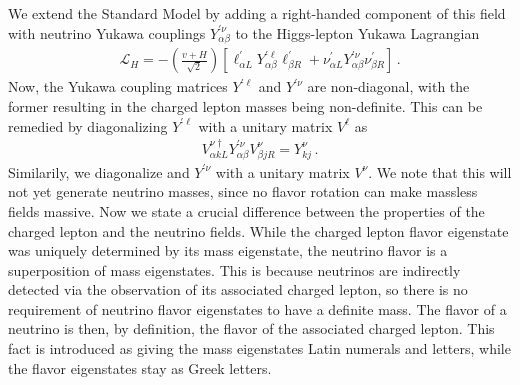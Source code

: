We extend the Standard Model by adding a right-handed component of this field with neutrino Yukawa couplings $Y_{\alpha \beta}^{\prime \nu}$ to the Higgs-lepton Yukawa Lagrangian 
\begin{align}
    \mathcal{L}_{H}=-\left( \frac{v + H}{\sqrt{2}} \right) \left[\ell_{\alpha L}^{\prime} Y_{\alpha \beta}^{\prime \ell} \ell_{\beta R}^{\prime} + \nu_{\alpha L}^{\prime} Y_{\alpha \beta}^{\prime \nu} \nu_{\beta R}^{\prime}\right]\,.
\end{align}
Now, the Yukawa coupling matrices $Y^{\prime \ell}$ and $Y^{\prime \nu}$ are non-diagonal, with the former resulting in the charged lepton masses being non-definite. 
This can be remedied by diagonalizing $Y^{\prime \ell}$ with a unitary matrix $V^\ell$ as
\begin{align}
    V_{\alpha k L}^{\nu \dagger} Y^{\prime \nu}_{\alpha \beta} V_{\beta j R}^{\nu}=Y^{\nu}_{kj} \,.
\end{align}
Similarily, we diagonalize and $Y^{\prime \nu}$ with a unitary matrix $V^\nu$. We note that this will not yet generate neutrino masses, since no flavor rotation can make massless fields massive.
Now we state a crucial difference between the properties of the charged lepton and the neutrino fields.
While the charged lepton flavor eigenstate was uniquely determined by its mass eigenstate, the neutrino flavor is a superposition of mass eigenstates. 
This is because neutrinos are indirectly detected via the observation of its associated charged lepton, so there is no requirement of neutrino flavor eigenstates to have a definite mass. 
The flavor of a neutrino is then, by definition, the flavor of the associated charged lepton. 
This fact is introduced as giving the mass eigenstates Latin numerals and letters, while the flavor eigenstates stay as Greek letters.

